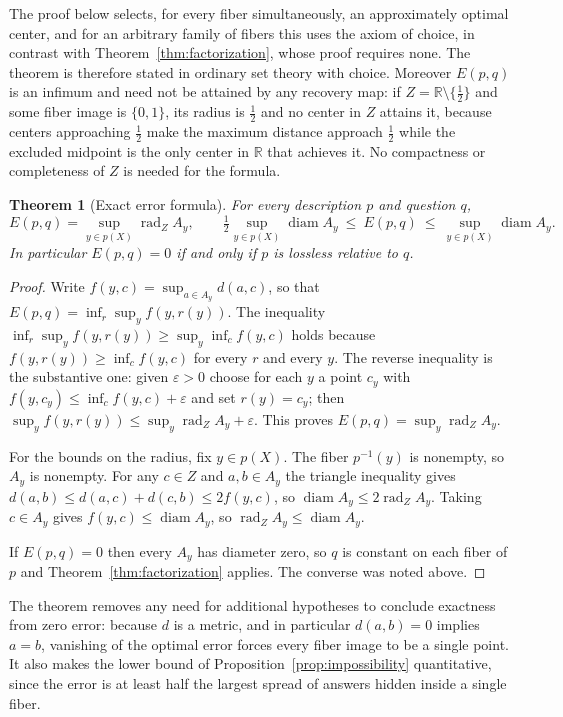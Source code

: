 \documentclass[11pt]{article}
\newtheorem{theorem}{Theorem}[section]
\theoremstyle{definition}
\theoremstyle{remark}
\newcommand{\R}{\mathbb{R}}
\newcommand{\diam}{\operatorname{diam}}
\newcommand{\rad}{\operatorname{rad}}
\begin{document}
The proof below selects, for every fiber simultaneously, an approximately optimal center, and for an arbitrary family of fibers this uses the axiom of choice, in contrast with Theorem~\ref{thm:factorization}, whose proof requires none. The theorem is therefore stated in ordinary set theory with choice. Moreover $E(p,q)$ is an infimum and need not be attained by any recovery map: if $Z=\R\setminus\{\tfrac12\}$ and some fiber image is $\{0,1\}$, its radius is $\tfrac12$ and no center in $Z$ attains it, because centers approaching $\tfrac12$ make the maximum distance approach $\tfrac12$ while the excluded midpoint is the only center in $\R$ that achieves it. No compactness or completeness of $Z$ is needed for the formula.

\begin{theorem}[Exact error formula]\label{thm:error}
For every description $p$ and question $q$,
\[
E(p,q)=\sup_{y\in p(X)}\rad_Z A_y,
\qquad
\tfrac12\sup_{y\in p(X)}\diam A_y\ \le\ E(p,q)\ \le\ \sup_{y\in p(X)}\diam A_y .
\]
In particular $E(p,q)=0$ if and only if $p$ is lossless relative to $q$.
\end{theorem}

\begin{proof}
Write $f(y,c)=\sup_{a\in A_y}d(a,c)$, so that $E(p,q)=\inf_r\sup_y f(y,r(y))$. The inequality $\inf_r\sup_y f(y,r(y))\ge\sup_y\inf_c f(y,c)$ holds because $f(y,r(y))\ge\inf_c f(y,c)$ for every $r$ and every $y$. The reverse inequality is the substantive one: given $\varepsilon>0$ choose for each $y$ a point $c_y$ with $f(y,c_y)\le\inf_c f(y,c)+\varepsilon$ and set $r(y)=c_y$; then $\sup_y f(y,r(y))\le\sup_y\rad_Z A_y+\varepsilon$. This proves $E(p,q)=\sup_y\rad_Z A_y$.

For the bounds on the radius, fix $y\in p(X)$. The fiber $p^{-1}(y)$ is nonempty, so $A_y$ is nonempty. For any $c\in Z$ and $a,b\in A_y$ the triangle inequality gives $d(a,b)\le d(a,c)+d(c,b)\le 2f(y,c)$, so $\diam A_y\le 2\rad_Z A_y$. Taking $c\in A_y$ gives $f(y,c)\le\diam A_y$, so $\rad_Z A_y\le\diam A_y$.

If $E(p,q)=0$ then every $A_y$ has diameter zero, so $q$ is constant on each fiber of $p$ and Theorem~\ref{thm:factorization} applies. The converse was noted above.
\end{proof}

The theorem removes any need for additional hypotheses to conclude exactness from zero error: because $d$ is a metric, and in particular $d(a,b)=0$ implies $a=b$, vanishing of the optimal error forces every fiber image to be a single point. It also makes the lower bound of Proposition~\ref{prop:impossibility} quantitative, since the error is at least half the largest spread of answers hidden inside a single fiber.
\end{document}
